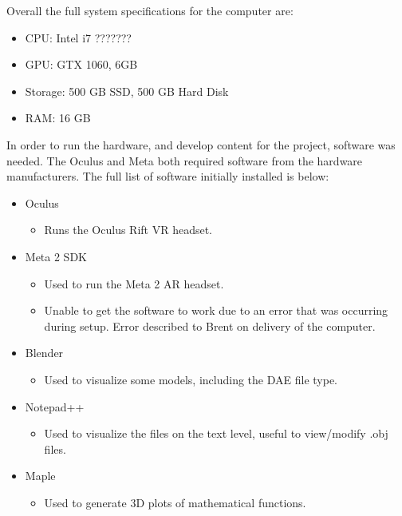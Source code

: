 Overall the full system specifications for the computer are:

\begin{itemize}
    \item CPU: Intel i7 ???????
    \item GPU: GTX 1060, 6GB
    \item Storage: 500 GB SSD, 500 GB Hard Disk
    \item RAM: 16 GB
\end{itemize}

In order to run the hardware, and develop content for the project, software was needed.  The Oculus and Meta both required software from the hardware manufacturers.  The full list of software initially installed is below:

\begin{itemize}
    \item Oculus
    \begin{itemize}
        \item Runs the Oculus Rift VR headset.
    \end{itemize}
    \item Meta 2 SDK
    \begin{itemize}
        \item Used to run the Meta 2 AR headset.
        \item Unable to get the software to work due to an error that was occurring during setup.  Error described to Brent on delivery of the computer.
    \end{itemize}
    \item Blender
    \begin{itemize}
        \item Used to visualize some models, including the DAE file type.
    \end{itemize}
    \item Notepad++
    \begin{itemize}
        \item Used to visualize the files on the text level, useful to view/modify .obj files.
    \end{itemize}
    \item Maple
    \begin{itemize}
        \item Used to generate 3D plots of mathematical functions.
    \end{itemize}
\end{itemize}